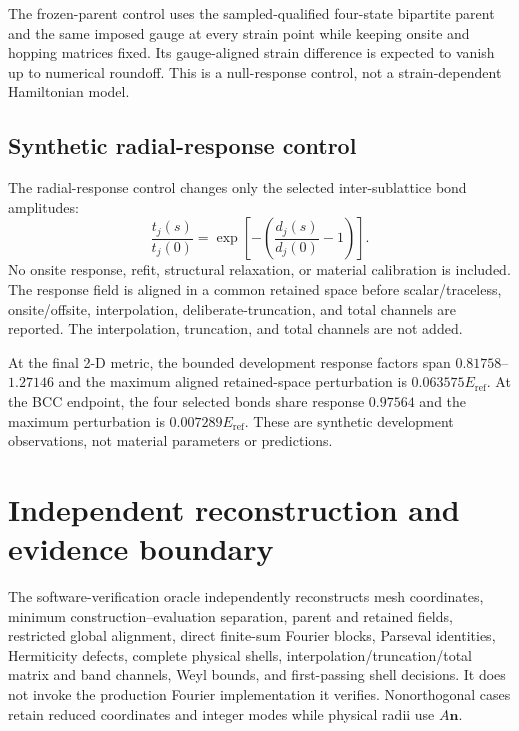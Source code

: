The frozen-parent control uses the sampled-qualified four-state bipartite parent and the
same imposed gauge at every strain point while keeping onsite and hopping matrices fixed.
Its gauge-aligned strain difference is expected to vanish up to numerical roundoff. This
is a null-response control, not a strain-dependent Hamiltonian model.

\subsection{Synthetic radial-response control}

The radial-response control changes only the selected inter-sublattice bond amplitudes:
\begin{equation}
 \frac{t_j(s)}{t_j(0)}=
 \exp\!\left[-\left(\frac{d_j(s)}{d_j(0)}-1\right)\right].
 \label{eq:app-radial-response}
\end{equation}
No onsite response, refit, structural relaxation, or material calibration is included.
The response field is aligned in a common retained space before scalar/traceless,
onsite/offsite, interpolation, deliberate-truncation, and total channels are reported.
The interpolation, truncation, and total channels are not added.

At the final 2-D metric, the bounded development response factors span
$0.81758$--$1.27146$ and the maximum aligned retained-space perturbation is
$0.063575E_{\mathrm{ref}}$. At the BCC endpoint, the four selected bonds share response
$0.97564$ and the maximum perturbation is $0.007289E_{\mathrm{ref}}$. These are
synthetic development observations, not material parameters or predictions.

\section{Independent reconstruction and evidence boundary}
\label{app:verification}

The software-verification oracle independently reconstructs mesh coordinates, minimum
construction--evaluation separation, parent and retained fields, restricted global
alignment, direct finite-sum Fourier blocks, Parseval identities, Hermiticity defects,
complete physical shells, interpolation/truncation/total matrix and band channels, Weyl
bounds, and first-passing shell decisions. It does not invoke the production Fourier
implementation it verifies. Nonorthogonal cases retain reduced coordinates and integer
modes while physical radii use $A\mathbf n$.

